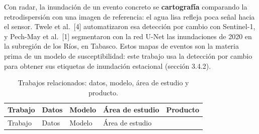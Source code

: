 Con radar, la inundación de un evento concreto se \textbf{cartografía} comparando la retrodispersión con una imagen de referencia: el agua lisa refleja poca señal hacia el sensor. Twele et al.~{[}4{]} automatizaron esa detección por cambio con Sentinel-1, y Pech-May et al.~{[}1{]} segmentaron con la red U-Net las inundaciones de 2020 en la subregión de los Ríos, en Tabasco. Estos mapas de eventos son la materia prima de un modelo de susceptibilidad: este trabajo usa la detección por cambio para obtener sus etiquetas de inundación estacional (sección 3.4.2).

\begin{longtable}[]{@{}
  >{\raggedright\arraybackslash}p{}
  >{\raggedright\arraybackslash}p{}
  >{\raggedright\arraybackslash}p{}
  >{\raggedright\arraybackslash}p{}
  >{\raggedright\arraybackslash}p{}@{}}
\caption{Trabajos relacionados: datos, modelo, área de estudio y producto.}\tabularnewline
\toprule\noalign{}
\begin{minipage}[b]{\linewidth}\raggedright
Trabajo
\end{minipage} & \begin{minipage}[b]{\linewidth}\raggedright
Datos
\end{minipage} & \begin{minipage}[b]{\linewidth}\raggedright
Modelo
\end{minipage} & \begin{minipage}[b]{\linewidth}\raggedright
Área de estudio
\end{minipage} & \begin{minipage}[b]{\linewidth}\raggedright
Producto
\end{minipage} \\
\midrule\noalign{}
\endfirsthead
\toprule\noalign{}
\begin{minipage}[b]{\linewidth}\raggedright
Trabajo
\end{minipage} & \begin{minipage}[b]{\linewidth}\raggedright
Datos
\end{minipage} & \begin{minipage}[b]{\linewidth}\raggedright
Modelo
\end{minipage} & \begin{minipage}[b]{\linewidth}\raggedright
Área de estudio
\end{minipage} & \begin{minipage}[b]{\linewidth}\raggedright

\end{minipage}
\end{longtable}
